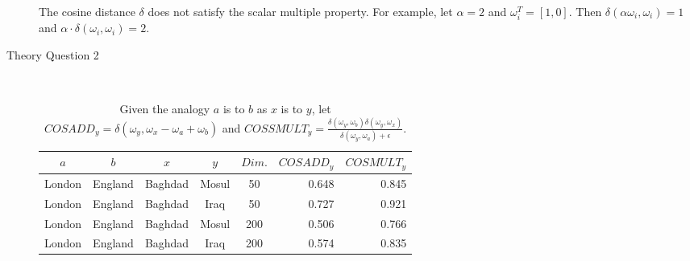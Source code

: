 \documentclass{article}
\newcommand*{\0}{\Vec{0}}
\newcommand*{\norm}[1]{\lVert#1\rVert_2}
\newcommand*{\al}{\alpha}
\newcommand*{\de}{\delta}
\newcommand*{\om}{\omega}
\newcommand*{\ep}{\epsilon}
\begin{document}
\begin{description}
		The cosine distance $\de$ does not satisfy the scalar multiple property.
		For example, let $\al=2$ and $\om_i^T=[1,0]$.
		Then $\de(\al\om_i,\om_i)=1$ and $\al\cdot\de(\om_i,\om_i)=2$.
	\item[Theory Question 2] \hfill \\
		\begin{table}[H]
			\centering
			\begin{tabular}{|ccccc|rr|}
				\hline
				$a$ & $b$ & $x$ & $y$ & $Dim.$ & $COSADD_y$ & $COSMULT_y$ \\
				\hline
				London & England & Baghdad & Mosul & 50 & 0.648 & 0.845 \\
				London & England & Baghdad & Iraq & 50 & 0.727 & 0.921 \\
				London & England & Baghdad & Mosul & 200 & 0.506 & 0.766 \\
				London & England & Baghdad & Iraq & 200 & 0.574 & 0.835 \\
				\hline
			\end{tabular}
			\caption{
				Given the analogy $a$ is to $b$ as $x$ is to $y$,
				let $COSADD_y = \de(\om_y,\om_x-\om_a+\om_b)$ and
				$COSSMULT_y = \frac{\de(\om_y,\om_b)\de(\om_y,\om_x)}{\de(\om_y,\om_a)+\ep}$.
}
\end{table}
\end{description}
\end{document}
